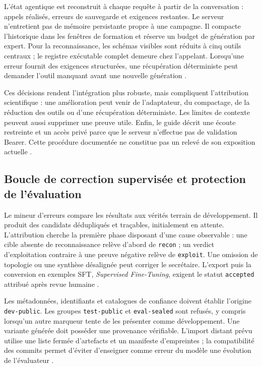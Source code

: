 \documentclass[11pt,a4paper]{article}
\begin{document}
L'état agentique est reconstruit à chaque requête à partir de la conversation :
appels réalisés, erreurs de sauvegarde et exigences restantes. Le serveur
n'entretient pas de mémoire persistante propre à une campagne. Il compacte
l'historique dans les fenêtres de formation et réserve un budget de génération
par expert. Pour la reconnaissance, les schémas visibles sont réduits à cinq
outils centraux ; le registre exécutable complet demeure chez l'appelant.
Lorsqu'une erreur fournit des exigences structurées, une récupération
déterministe peut demander l'outil manquant avant une nouvelle génération
\cite{ml-server}.

Ces décisions rendent l'intégration plus robuste, mais compliquent
l'attribution scientifique : une amélioration peut venir de l'adaptateur, du
compactage, de la réduction des outils ou d'une récupération déterministe.
Les limites de contexte peuvent aussi supprimer une preuve utile. Enfin, le
guide décrit une écoute restreinte et un accès privé parce que le serveur
n'effectue pas de validation Bearer. Cette procédure documentée ne constitue
pas un relevé de son exposition actuelle \cite{ml-service}.

\subsection{Boucle de correction supervisée et protection de l'évaluation}

Le mineur d'erreurs compare les résultats aux vérités terrain de développement.
Il produit des candidats dédupliqués et traçables, initialement en attente.
L'attribution cherche la première phase disposant d'une cause observable : une
cible absente de reconnaissance relève d'abord de \texttt{recon} ; un verdict
d'exploitation contraire à une preuve négative relève de \texttt{exploit}.
Une omission de topologie ou une synthèse désalignée peut corriger le secrétaire.
L'export puis la conversion en exemples SFT, \emph{Supervised Fine-Tuning},
exigent le statut \texttt{accepted} attribué après revue humaine
\cite{ml-learning,ml-sft}.

Les métadonnées, identifiants et catalogues de confiance doivent établir
l'origine \texttt{dev-public}. Les groupes \texttt{test-public} et
\texttt{eval-sealed} sont refusés, y compris lorsqu'un autre marqueur tente de
les présenter comme développement. Une variante générée doit posséder une
provenance vérifiable. L'import distant prévu utilise une liste fermée
d'artefacts et un manifeste d'empreintes ; la compatibilité des commits permet
d'éviter d'enseigner comme erreur du modèle une évolution de l'évaluateur
\cite{ml-learning,ml-import}.
\end{document}
